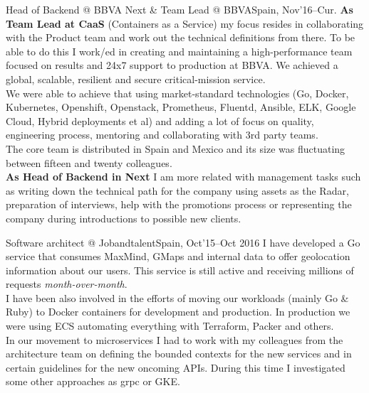 \documentclass[11pt, a4paper, sans]{moderncv}
\begin{document}
\makecvtitle\vspace{-2.5em}

%
% 


\cventry{}{}
{Head of Backend @ BBVA Next \& Team Lead @ BBVA}{Spain, Nov'16--Cur.}
{}
{\vspace{-1em}\textbf{As Team Lead at CaaS} (Containers as a Service) my focus resides in collaborating with the Product team and work out the technical definitions from there. To be able to do this I work/ed in creating and maintaining a high-performance team focused on results and 24x7 support to production at BBVA. We achieved a global, scalable, resilient and secure critical-mission service.\\
We were able to achieve that using market-standard technologies (Go, Docker, Kubernetes, Openshift, Openstack, Prometheus, Fluentd, Ansible, ELK, Google Cloud, Hybrid deployments et al) and adding a lot of focus on quality, engineering process, mentoring and collaborating with 3rd party teams.\\
The core team is distributed in Spain and Mexico and its size was fluctuating between fifteen and twenty colleagues.\\
\textbf{As Head of Backend in Next} I am more related with management tasks such as writing down the technical path for the company using assets as the Radar, preparation of interviews, help with the promotions process or representing the company during introductions to possible new clients.\\}

\cventry{}{}
{Software architect @ Jobandtalent}{Spain, Oct'15--Oct 2016}
{}
{\vspace{-1em}I have developed a Go service that consumes MaxMind, GMaps and internal data to offer geolocation information about our users. This service is still active and receiving millions of requests \textit{month-over-month}.\\
I have been also involved in the efforts of moving our workloads (mainly Go \& Ruby) to Docker containers for development and production.
In production we were using ECS automating everything with Terraform, Packer and others.\\
In our movement to microservices I had to work with my colleagues from the architecture team on defining the bounded contexts for the new services and in certain guidelines for the new oncoming APIs. During this time I investigated some other approaches as grpc or GKE.\\}
\end{document}
